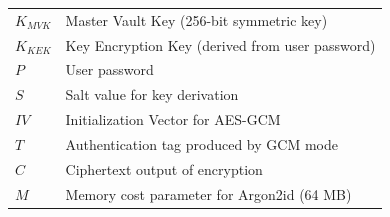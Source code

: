 \begin{longtable}[l]{l l}
$K_{MVK}$        & Master Vault Key (256-bit symmetric key)                       \\
$K_{KEK}$        & Key Encryption Key (derived from user password)                \\
$P$              & User password                                                  \\
$S$              & Salt value for key derivation                                  \\
$IV$             & Initialization Vector for AES-GCM                             \\
$T$              & Authentication tag produced by GCM mode                        \\
$C$              & Ciphertext output of encryption                                \\
$M$              & Memory cost parameter for Argon2id (64 MB)                     \\
\end{longtable}
